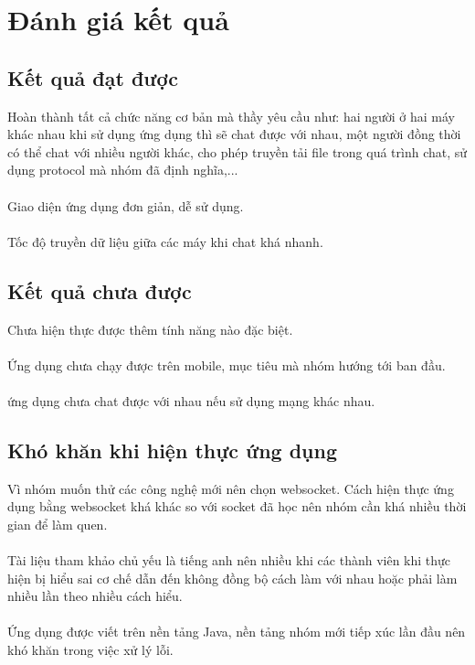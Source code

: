\documentclass[10pt]{article}
\begin{document}
	\section{Đánh giá kết quả}
		\subsection{Kết quả đạt được}
		Hoàn thành tất cả chức năng cơ bản mà thầy yêu cầu như: hai người ở hai máy khác nhau khi sử dụng ứng dụng thì sẽ chat được với nhau, một người đồng thời có thể chat với nhiều người khác, cho phép truyền tải file trong quá trình chat, sử dụng protocol mà nhóm đã định nghĩa,...\\\\
		Giao diện ứng dụng đơn giản, dễ sử dụng.\\\\
		Tốc độ truyền dữ liệu giữa các máy khi chat khá nhanh.\\
		\subsection{Kết quả chưa được}
Chưa hiện thực được thêm tính năng nào đặc biệt.\\\\
Ứng dụng chưa chạy được trên mobile, mục tiêu mà nhóm hướng tới ban đầu.\\\\
ứng dụng chưa chat được với nhau nếu sử dụng mạng khác nhau.\\
		\subsection{Khó khăn khi hiện thực ứng dụng}
Vì nhóm muốn thử các công nghệ mới nên chọn websocket. Cách hiện thực ứng dụng bằng websocket khá khác so với socket đã học nên nhóm cần khá nhiều thời gian để làm quen.\\\\
Tài liệu tham khảo chủ yếu là tiếng anh nên nhiều khi các thành viên khi thực hiện bị hiểu sai cơ chế dẫn đến không đồng bộ cách làm với nhau hoặc phải làm nhiều lần theo nhiều cách hiểu.\\\\
Ứng dụng được viết trên nền tảng Java, nền tảng nhóm mới tiếp xúc lần đầu nên khó khăn trong việc xử lý lỗi.\\
\end{document}
